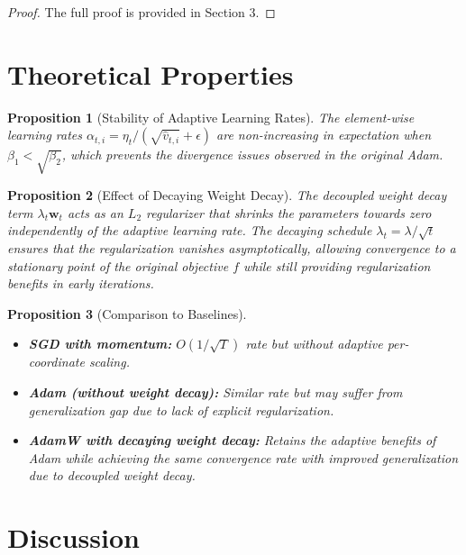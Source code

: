 \documentclass{article}
\theoremstyle{plain}
\newtheorem{proposition}{Proposition}
\theoremstyle{definition}
\renewcommand{\vec}[1]{\boldsymbol{#1}}
\begin{document}
\begin{proof}
The full proof is provided in Section 3.
\end{proof}

\section*{Theoretical Properties}

\begin{proposition}[Stability of Adaptive Learning Rates]
The element-wise learning rates $\alpha_{t,i} = \eta_t / (\sqrt{\hat{v}_{t,i}} + \epsilon)$ are non-increasing in expectation when $\beta_1 < \sqrt{\beta_2}$, which prevents the divergence issues observed in the original Adam.
\end{proposition}

\begin{proposition}[Effect of Decaying Weight Decay]
The decoupled weight decay term $\lambda_t \vec{w}_t$ acts as an $L_2$ regularizer that shrinks the parameters towards zero independently of the adaptive learning rate. The decaying schedule $\lambda_t = \lambda/\sqrt{t}$ ensures that the regularization vanishes asymptotically, allowing convergence to a stationary point of the original objective $f$ while still providing regularization benefits in early iterations.
\end{proposition}

\begin{proposition}[Comparison to Baselines]
\begin{itemize}
    \item \textbf{SGD with momentum:} $O(1/\sqrt{T})$ rate but without adaptive per-coordinate scaling.
    \item \textbf{Adam (without weight decay):} Similar rate but may suffer from generalization gap due to lack of explicit regularization.
    \item \textbf{AdamW with decaying weight decay:} Retains the adaptive benefits of Adam while achieving the same convergence rate with improved generalization due to decoupled weight decay.
\end{itemize}
\end{proposition}

\section*{Discussion}
\end{document}

